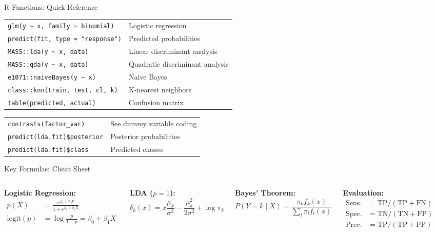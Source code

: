 \documentclass[aspectratio=169, 11pt]{beamer}
\begin{document}
\begin{frame}{R Functions: Quick Reference}

\begin{center}
\begin{tabular}{ll}
\toprule
\texttt{glm(y \textasciitilde{} x, family = binomial)} & Logistic regression \\
\texttt{predict(fit, type = "response")} & Predicted probabilities \\
\texttt{MASS::lda(y \textasciitilde{} x, data)} & Linear discriminant analysis \\
\texttt{MASS::qda(y \textasciitilde{} x, data)} & Quadratic discriminant analysis \\
\texttt{e1071::naiveBayes(y \textasciitilde{} x)} & Naive Bayes \\
\texttt{class::knn(train, test, cl, k)} & K-nearest neighbors \\
\texttt{table(predicted, actual)} & Confusion matrix \\
\bottomrule
\end{tabular}
\end{center}

\vspace{0.5em}
\begin{center}
\begin{tabular}{ll}
\toprule
\texttt{contrasts(factor\_var)} & See dummy variable coding \\
\texttt{predict(lda.fit)\$posterior} & Posterior probabilities \\
\texttt{predict(lda.fit)\$class} & Predicted classes \\
\bottomrule
\end{tabular}
\end{center}
\end{frame}


\begin{frame}{Key Formulas: Cheat Sheet}
\begin{columns}
\textbf{Logistic Regression:}
\begin{align*}
p(X) &= \frac{e^{\beta_0 + \beta_1 X}}{1 + e^{\beta_0 + \beta_1 X}} \\[4pt]
\text{logit}(p) &= \log\frac{p}{1-p} = \beta_0 + \beta_1 X
\end{align*}

\textbf{LDA ($p = 1$):}
$$\delta_k(x) = x\frac{\mu_k}{\sigma^2} - \frac{\mu_k^2}{2\sigma^2} + \log \pi_k$$

\textbf{Bayes' Theorem:}
$$P(Y=k \mid X) = \frac{\pi_k f_k(x)}{\sum_l \pi_l f_l(x)}$$

\textbf{Evaluation:}
\begin{align*}
\text{Sens.} &= \text{TP} / (\text{TP} + \text{FN}) \\
\text{Spec.} &= \text{TN} / (\text{TN} + \text{FP}) \\
\text{Prec.} &= \text{TP} / (\text{TP} + \text{FP})
\end{align*}
\end{columns}
\end{frame}
\end{document}
